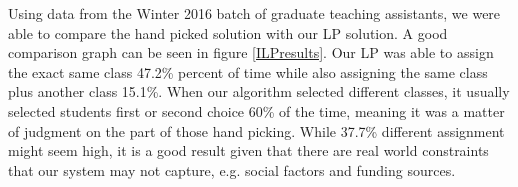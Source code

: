 Using data from the Winter 2016 batch of graduate teaching assistants, we were able to compare the hand picked solution with our LP solution.
A good comparison graph can be seen in figure \ref{ILPresults}.
Our LP was able to assign the exact same class 47.2\% percent of time while also assigning the same class plus another class 15.1\%.
When our algorithm selected different classes, it usually selected students first or second choice 60\% of the time, meaning it was a matter of judgment on the part of those hand picking.
While 37.7\% different assignment might seem high, it is a good result given that there are real world constraints that our system may not capture, e.g. social factors and funding sources.
